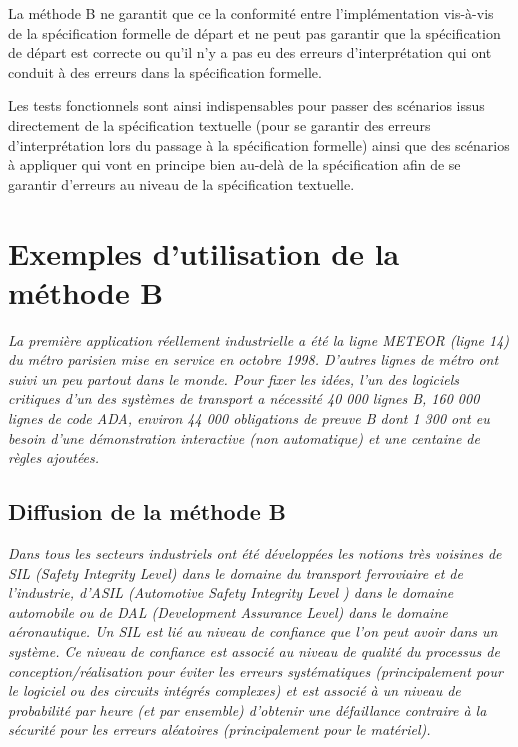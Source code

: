 \documentclass[10pt,a4paper]{article}
\begin{document}
La méthode B ne garantit que ce la conformité entre l'implémentation vis-à-vis de la spécification formelle de départ et ne peut pas garantir que la spécification de départ est correcte ou qu'il n'y a pas eu des erreurs d'interprétation qui ont conduit à des erreurs dans la spécification formelle.

Les tests fonctionnels sont ainsi indispensables pour passer des scénarios issus directement de la spécification textuelle (pour se garantir des erreurs d'interprétation lors du passage à la spécification formelle) ainsi que des scénarios à appliquer qui vont en principe bien au-delà de la spécification afin de se garantir d'erreurs au niveau de la spécification textuelle.

\section{Exemples d'utilisation de la méthode B}

\emph{La première application réellement industrielle a été la ligne METEOR (ligne 14) du métro parisien mise en service en octobre 1998. D'autres lignes de métro ont suivi un peu partout dans le monde. Pour fixer les idées, l'un des logiciels critiques d'un des systèmes de transport a nécessité 40 000 lignes B, 160 000 lignes de code ADA, environ 44 000 obligations de preuve B dont 1 300 ont eu besoin d'une démonstration interactive (non automatique) et une centaine de règles ajoutées.}\cite{dossierTechnique}

\subsection{Diffusion de la méthode B}
\emph{Dans tous les secteurs industriels ont été développées les notions très voisines de SIL (Safety Integrity Level) dans le domaine du transport ferroviaire et de l’industrie, d’ASIL (Automotive Safety Integrity Level ) dans le domaine automobile ou de DAL (Development Assurance Level) dans le domaine aéronautique. Un SIL est lié au niveau de confiance que l'on peut avoir dans un système. Ce niveau de confiance est associé au niveau de qualité du processus de conception/réalisation pour éviter les erreurs systématiques (principalement pour le logiciel ou des circuits intégrés complexes) et est associé à un niveau de probabilité par heure (et par ensemble) d'obtenir une défaillance contraire à la sécurité pour les erreurs aléatoires (principalement pour le matériel).}\cite{dossierTechnique}
\end{document}
